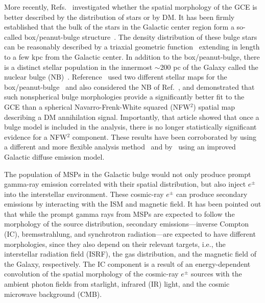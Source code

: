 \documentclass[doublespace,nopageskip]{VTthesis}
\begin{document}
More recently, Refs.~\cite{2018NatAs...2..387M,2018NatAs...2..819B,2019JCAP...09..042M} investigated whether the spatial morphology of the GCE is better described by the distribution of stars or by DM. It has been firmly established that the bulk of the stars in the Galactic center region form a so-called box/peanut-bulge structure~\cite{1995ApJ...445..716D,1998ApJ...492..495F,2000MNRAS.313..392L,2010ApJ...721L..28N,2013MNRAS.435.1874W}. The density distribution of these bulge stars can be reasonably described by a triaxial geometric function~\cite{1998ApJ...492..495F,2010ApJ...721L..28N,2013MNRAS.435.1874W} extending in length to a few kpc from the Galactic center. In addition to the box/peanut-bulge, there is a distinct stellar population in the innermost $\sim$200 pc of the Galaxy called the nuclear bulge (NB)~\cite{2013ApJ...769L..28N}. Reference~\cite{2018NatAs...2..387M} used two different stellar maps for the box/peanut-bulge~\cite{1998ApJ...492..495F,2016AJ....152...14N} and also considered the NB of Ref.~\cite{2013ApJ...769L..28N}, and demonstrated that such nonspherical bulge morphologies provide a significantly better fit to the GCE than a spherical Navarro-Frenk-White squared (NFW$^2$) spatial map describing a DM annihilation signal. Importantly, that article showed that once a bulge model is included in the analysis, there is no longer statistically significant evidence for a NFW$^2$ component. These results have been corroborated by \citet{2018NatAs...2..819B} using a different and more flexible analysis method~\cite{2017JCAP...08..022S} and by~\citet{2019JCAP...09..042M} using an improved Galactic diffuse emission model.

The population of MSPs in the Galactic bulge would not only produce prompt gamma-ray emission correlated with their spatial distribution, but also inject $e^\pm$ into the interstellar environment. These cosmic-ray $e^\pm$ can produce secondary emissions by interacting with the ISM and magnetic field. It has been pointed out that while the prompt gamma rays from MSPs are expected to follow the morphology of the source distribution, secondary emissions---inverse Compton (IC), bremsstrahlung, and synchrotron radiation---are expected to have different morphologies, since they also depend on their relevant targets, i.e., the interstellar radiation field (ISRF), the gas distribution, and the magnetic field of the Galaxy, respectively. The IC component is a result of an energy-dependent convolution of the spatial morphology of the cosmic-ray $e^\pm$ sources with the ambient photon fields from starlight, infrared (IR) light, and the cosmic microwave background (CMB).
\end{document}
